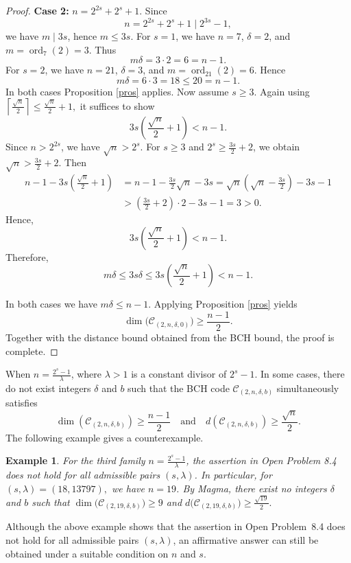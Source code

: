 \documentclass[12pt,draftcls,journal,onecolumn]{IEEEtran}
\newtheorem{example}[theorem]{Example}
\begin{document}
\begin{proof}
\noindent
\textbf{Case 2:}  \(n=2^{2s}+2^s+1\).
Since
\[
n=2^{2s}+2^s+1\mid 2^{3s}-1,
\]
we have \(m\mid 3s\), hence \(m\le 3s\).
For \(s=1\), we have \(n=7\), \(\delta=2\), and \(m=\operatorname{ord}_7(2)=3\). Thus
\[
m\delta=3\cdot 2=6=n-1.
\]
For \(s=2\), we have \(n=21\), \(\delta=3\), and \(m=\operatorname{ord}_{21}(2)=6\). Hence
\[
m\delta=6\cdot 3=18\le 20=n-1.
\]
In both cases Proposition \ref{pros} applies.
Now assume \(s\ge 3\). Again using
$
\left\lceil \frac{\sqrt n}{2}\right\rceil\le \frac{\sqrt n}{2}+1,
$
it suffices to show
\[
3s\left(\frac{\sqrt n}{2}+1\right)<n-1.
\]
Since \(n>2^{2s}\), we have \(\sqrt n>2^s\). For \(s\ge 3\) and \(2^s\ge \frac{3s}{2}+2\), we obtain
$
\sqrt n>\frac{3s}{2}+2.
$
Then
\[
\begin{aligned}
n-1-3s\left(\frac{\sqrt n}{2}+1\right)
&=n-1-\frac{3s}{2}\sqrt n-3s=\sqrt n\left(\sqrt n-\frac{3s}{2}\right)-3s-1\\
&>\left(\frac{3s}{2}+2\right)\cdot 2-3s-1=3>0.
\end{aligned}
\]
Hence,
\[
3s\left(\frac{\sqrt n}{2}+1\right)<n-1.
\]
Therefore,
\[
m\delta\le 3s\delta
\le 3s\left(\frac{\sqrt n}{2}+1\right)
<n-1.
\]

In both cases we have \(m\delta\le n-1\). Applying Proposition \ref{pros} yields
\[
\dim\bigl(\mathcal C_{(2,n,\delta,0)}\bigr)\ge \frac{n-1}{2}.
\]
Together with the distance bound obtained from the BCH bound, the proof is complete.
\end{proof}

When $n=\frac{2^s-1}{\lambda}$, where $\lambda>1$ is a constant divisor of $2^s-1$. In some cases, there do not exist integers \(\delta\) and \(b\) such that the BCH code \(\mathcal C_{(2,n,\delta,b)}\) simultaneously satisfies
\[
\dim (\mathcal C_{(2,n,\delta,b)})\ge \frac{n-1}{2}
\quad\text{and}\quad
d(\mathcal C_{(2,n,\delta,b)})\ge \frac{\sqrt n}{2}.
\]
The following example gives a counterexample.


\begin{example} For the third family $n=\frac{2^s-1}{\lambda}$, the assertion in Open Problem 8.4 \cite{Chen59} does not hold for all admissible pairs $(s,\lambda)$. In particular, for $(s,\lambda)=(18,13797),$ we have $n=19$. By Magma, there exist no integers $\delta$ and $b$ such that $\dim\bigl(\mathcal{C}_{(2,19,\delta,b)}\bigr)\ge 9$ and $ d\bigl(\mathcal{C}_{(2,19,\delta,b)}\bigr)\ge \frac{\sqrt{19}}{2}. $ \end{example}


Although the above example shows that the assertion in Open
Problem~8.4 does not hold for all admissible pairs \((s,\lambda)\),
an affirmative answer can still be obtained under a suitable
condition on \(n\) and \(s\).
\end{document}
